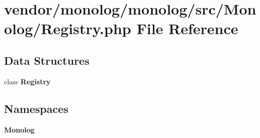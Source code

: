 \section{vendor/monolog/monolog/src/\+Monolog/\+Registry.php File Reference}
\label{_registry_8php}
\subsection*{Data Structures}
\begin{DoxyCompactItemize}
\item 
class {\bf Registry}
\end{DoxyCompactItemize}
\subsection*{Namespaces}
\begin{DoxyCompactItemize}
\item 
 {\bf Monolog}
\end{DoxyCompactItemize}
